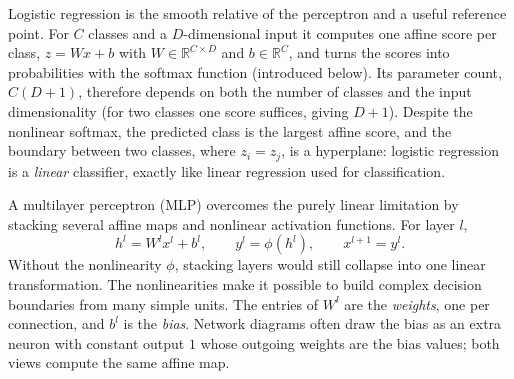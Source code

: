 Logistic regression is the smooth relative of the perceptron and a useful
reference point. For $C$ classes and a $D$-dimensional input it computes one
affine score per class, $z = Wx + b$ with $W \in \mathbb{R}^{C\times D}$ and
$b\in\mathbb{R}^C$, and turns the scores into probabilities with the softmax
function (introduced below). Its parameter count, $C(D+1)$, therefore depends on
both the number of classes and the input dimensionality (for two classes one
score suffices, giving $D+1$). Despite the nonlinear softmax, the predicted class
is the largest affine score, and the boundary between two classes, where
$z_i = z_j$, is a hyperplane: logistic regression is a \emph{linear} classifier,
exactly like linear regression used for classification.

A multilayer perceptron (MLP) overcomes the purely linear limitation by stacking
several affine maps and nonlinear activation functions. For layer $l$,
\begin{equation}
  h^l = W^l x^l + b^l,\qquad
  y^l = \phi(h^l),\qquad
  x^{l+1}=y^l .
\end{equation}
\noindent
Without the nonlinearity $\phi$, stacking layers would still collapse into one
linear transformation. The nonlinearities make it possible to build complex
decision boundaries from many simple units. The entries of $W^l$ are the
\emph{weights}, one per connection, and $b^l$ is the \emph{bias}. Network
diagrams often draw the bias as an extra neuron with constant output $1$ whose
outgoing weights are the bias values; both views compute the same affine map.


